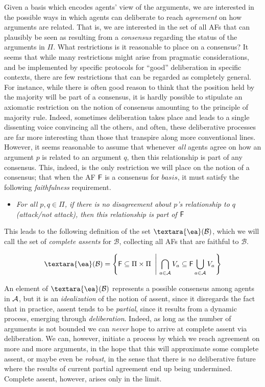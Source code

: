 \documentclass{llncs}
\newcommand{\cons}[1]{{\textara{\ea}}(#1)}
\newcommand{\af}{{\sf F}}
\newcommand{\basis}{basis }
\newcommand{\views}{\mathcal B}
\begin{document}
Given a basis which encodes agents' view of the arguments, we are interested in the possible ways in which agents can deliberate to reach \emph{agreement} on how arguments are related. That is, we are interested in the set of all AFs that can plausibly be seen as resulting from a \emph{consensus} regarding the status of the arguments in $\Pi$. What restrictions is it reasonable to place on a consensus? It seems that while many restrictions might arise from pragmatic considerations, and be implemented by specific protocols for ``good'' deliberation in specific contexts, there are few restrictions that can be regarded as completely general. For instance, while there is often good reason to think that the position held by the majority will be part of a consensus, it is hardly possible to stipulate an axiomatic restriction on the notion of consensus amounting to the principle of majority rule. Indeed, sometimes deliberation takes place and leads to a single dissenting voice convincing all the others, and often, these deliberative processes are far more interesting than those that transpire along more conventional lines. However, it seems reasonable to assume that whenever \emph{all} agents agree on how an argument $p$ is related to an argument $q$, then this relationship is part of any consensus. This, indeed, is the only restriction we will place on the notion of a consensus; that when the AF $\af$ is a consensus for $\basis$, it must satisfy the following \emph{faithfulness} requirement.
\begin{itemize}
\item \emph{For all $p,q \in \Pi$, if there is no disagreement about $p$'s relationship to $q$ (attack/not attack), then this relationship is part of $\af$}
\end{itemize}

This leads to the following definition of the set $\cons \views$, which we will call the set of \emph{complete assents} for $\views$, collecting all AFs that are faithful to $\views$.

\begin{equation}\label{def:consensus}
\cons \views = \left\{\af \subseteq \Pi \times \Pi ~\left|~ \bigcap_{a \in \agents}V_a \subseteq \af \bigcup_{a \in \agents}V_a\right.\right\}
\end{equation}

An element of $\cons \views$ represents a possible consensus among agents in $\mathcal A$, but it is an \emph{idealization} of the notion of assent, since it disregards the fact that in practice, assent tends to be \emph{partial}, since it results from a dynamic process, emerging through \emph{deliberation}. Indeed, as long as the number of arguments is not bounded we can \emph{never} hope to arrive at complete assent via deliberation. We can, however, initiate a process by which we reach agreement on more and more arguments, in the hope that this will approximate some complete assent, or maybe even be \emph{robust}, in the sense that there is \emph{no} deliberative future where the results of current partial agreement end up being undermined. Complete assent, however, arises only in the limit.
\end{document}
